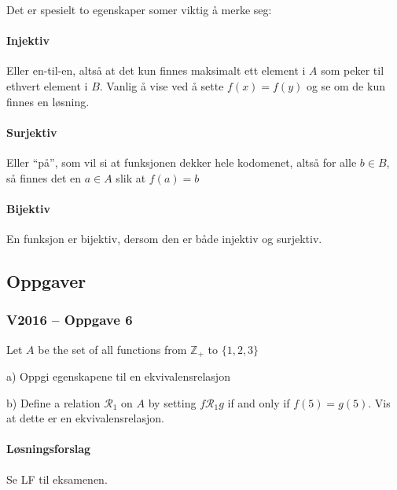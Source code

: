 Det er spesielt to egenskaper somer viktig å merke seg:

\paragraph*{Injektiv} Eller en-til-en, altså at det kun finnes maksimalt ett element i $A$ som peker til ethvert element i $B$. Vanlig å vise ved å sette $f(x)=f(y)$ og se om de kun finnes en løsning.
\paragraph*{Surjektiv} Eller \enquote{på}, som vil si at funksjonen dekker hele kodomenet, altså for alle $b\in B$, så finnes det en $a\in A$ slik at $f(a)=b$
\paragraph*{Bijektiv} En funksjon er bijektiv, dersom den er både injektiv og surjektiv.


\subsection{Oppgaver}

\subsubsection{V2016 – Oppgave 6}
Let $A$ be the set of all functions from $\mathbb{Z}_+$ to $\{1,2,3\}$

a) Oppgi egenskapene til en ekvivalensrelasjon

b) Define a relation $\mathcal{R}_1$ on $A$ by setting $f\mathcal{R}_1 g$ if and only if $f(5)=g(5)$. Vis at dette er en ekvivalensrelasjon.

\paragraph*{Løsningsforslag}
Se LF til eksamenen.